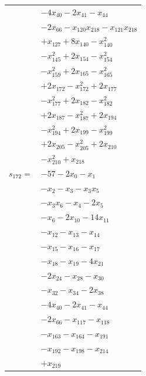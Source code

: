 \begin{longtable}{@{}r@{\;}l@{}}
 & \(\displaystyle -4x_{40} -2x_{41} -x_{44}\) \\
 & \(\displaystyle -2x_{66} -x_{120}x_{218} -x_{121}x_{218}\) \\
 & \(\displaystyle +x_{127} +8x_{140} -x_{140}^{2}\) \\
 & \(\displaystyle -x_{145}^{2} +2x_{154} -x_{154}^{2}\) \\
 & \(\displaystyle -x_{159}^{2} +2x_{165} -x_{165}^{2}\) \\
 & \(\displaystyle +2x_{172} -x_{172}^{2} +2x_{177}\) \\
 & \(\displaystyle -x_{177}^{2} +2x_{182} -x_{182}^{2}\) \\
 & \(\displaystyle +2x_{187} -x_{187}^{2} +2x_{194}\) \\
 & \(\displaystyle -x_{194}^{2} +2x_{199} -x_{199}^{2}\) \\
 & \(\displaystyle +2x_{205} -x_{205}^{2} +2x_{210}\) \\
 & \(\displaystyle -x_{210}^{2} +x_{218}\) \\[3pt]
\(s_{172}=\) & \(\displaystyle -57 -2x_{0} -x_{1}\) \\
 & \(\displaystyle -x_{2} -x_{3} -x_{3}x_{5}\) \\
 & \(\displaystyle -x_{3}x_{6} -x_{4} -2x_{5}\) \\
 & \(\displaystyle -x_{6} -2x_{10} -14x_{11}\) \\
 & \(\displaystyle -x_{12} -x_{13} -x_{14}\) \\
 & \(\displaystyle -x_{15} -x_{16} -x_{17}\) \\
 & \(\displaystyle -x_{18} -x_{19} -4x_{21}\) \\
 & \(\displaystyle -2x_{24} -x_{28} -x_{30}\) \\
 & \(\displaystyle -x_{32} -x_{34} -2x_{38}\) \\
 & \(\displaystyle -4x_{40} -2x_{41} -x_{44}\) \\
 & \(\displaystyle -2x_{66} -x_{117} -x_{118}\) \\
 & \(\displaystyle -x_{163} -x_{164} -x_{191}\) \\
 & \(\displaystyle -x_{192} -x_{198} -x_{214}\) \\
 & \(\displaystyle +x_{219}\) \\[3pt]
\end{longtable}
\endgroup
